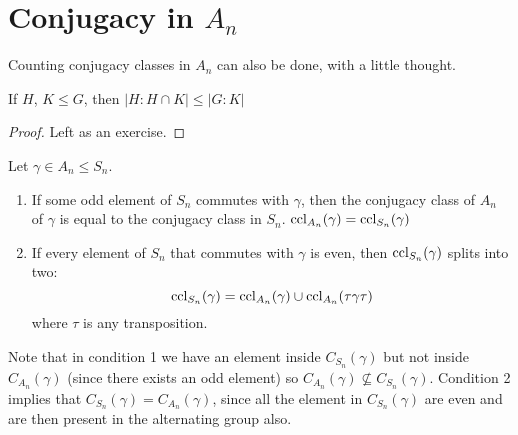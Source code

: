 \documentclass[../Main.tex]{subfiles}
\begin{document}
\section{Conjugacy in \texorpdfstring{$A_n$}{An}}
Counting conjugacy classes in $A_n$ can also be done, with a little thought.
\begin{proposition}
    If $H$, $K \leq G$, then $|H : H \cap K| \leq |G : K|$
    \label{propSubgroupIndices}
\end{proposition}
\begin{proof}
Left as an exercise.
\end{proof}%
\begin{lemma}
    Let $\gamma \in A_n \leq S_n$.
    \begin{enumerate}
        \item If some odd element of $S_n$ commutes with $\gamma$, then the conjugacy class of $A_n$ of $\gamma$ is equal to the conjugacy class in $S_n$. $\operatorname{ccl}_{A_n}(\gamma) = \operatorname{ccl}_{S_n}(\gamma)$
        \item If every element of $S_n$ that commutes with $\gamma$ is even, then $\operatorname{ccl}_{S_n}(\gamma)$ splits into two:
        \begin{equation*}
            \operatorname{ccl}_{S_n}(\gamma) = \operatorname{ccl}_{A_n}(\gamma) \cup \operatorname{ccl}_{A_n}(\tau\gamma\tau) 
        \end{equation*}
        where $\tau$ is any transposition.
    \end{enumerate}
    \label{lemConjugacyAn}
\end{lemma}
Note that in condition 1 we have an element inside $C_{S_n}(\gamma)$ but not inside $C_{A_n}(\gamma)$ (since there exists an odd element) so $C_{A_n}(\gamma) \nsubseteq C_{S_n}(\gamma)$. Condition 2 implies that $C_{S_n}(\gamma) = C_{A_n}(\gamma)$, since all the element in $C_{S_n}(\gamma)$ are even and are then present in the alternating group also.\par
\end{document}
